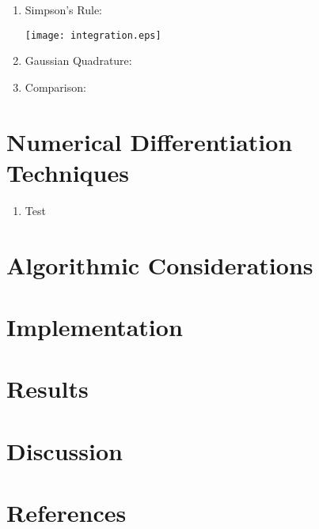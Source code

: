 \documentclass{report}
\begin{document}
\begin{enumerate}
\item Simpson's Rule:

\texttt{[image: integration.eps]}

\item Gaussian Quadrature:

\item Comparison:

\end{enumerate}


\section{Numerical Differentiation Techniques}
\begin{enumerate}
\item Test
\end{enumerate}

\section{Algorithmic Considerations}
\section{Implementation}
\section{Results}
\section{Discussion}
\section{References}
\end{document}
